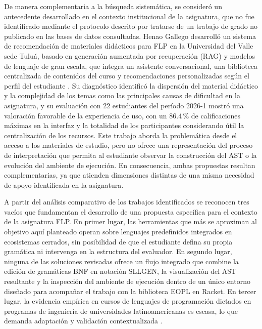 De manera complementaria a la búsqueda sistemática, se consideró un antecedente desarrollado en el contexto institucional de la asignatura, que no fue identificado mediante el protocolo descrito por tratarse de un trabajo de grado no publicado en las bases de datos consultadas. Henao Gallego desarrolló un sistema de recomendación de materiales didácticos para FLP en la Universidad del Valle sede Tuluá, basado en generación aumentada por recuperación (RAG) y modelos de lenguaje de gran escala, que integra un asistente conversacional, una biblioteca centralizada de contenidos del curso y recomendaciones personalizadas según el perfil del estudiante \cite{henao2026recomendacion}. Su diagnóstico identificó la dispersión del material didáctico y la complejidad de los temas como las principales causas de dificultad en la asignatura, y su evaluación con 22 estudiantes del período 2026-1 mostró una valoración favorable de la experiencia de uso, con un 86.4\,\% de calificaciones máximas en la interfaz y la totalidad de los participantes considerando útil la centralización de los recursos. Este trabajo aborda la problemática desde el acceso a los materiales de estudio, pero no ofrece una representación del proceso de interpretación que permita al estudiante observar la construcción del AST o la evolución del ambiente de ejecución. En consecuencia, ambas propuestas resultan complementarias, ya que atienden dimensiones distintas de una misma necesidad de apoyo identificada en la asignatura.

A partir del análisis comparativo de los trabajos identificados se reconocen tres vacíos que fundamentan el desarrollo de una propuesta específica para el contexto de la asignatura FLP. En primer lugar, las herramientas que más se aproximan al objetivo aquí planteado \cite{Cai2023VisualizingEnvironments, Abad2024BeyondSICP, Spigariol2023Aprendiendo} operan sobre lenguajes predefinidos integrados en ecosistemas cerrados, sin posibilidad de que el estudiante defina su propia gramática ni intervenga en la estructura del evaluador. En segundo lugar, ninguna de las soluciones revisadas ofrece un flujo integrado que combine la edición de gramáticas BNF en notación SLLGEN, la visualización del AST resultante y la inspección del ambiente de ejecución dentro de un único entorno diseñado para acompañar el trabajo con la biblioteca EOPL en Racket. En tercer lugar, la evidencia empírica en cursos de lenguajes de programación dictados en programas de ingeniería de universidades latinoamericanas es escasa, lo que demanda adaptación y validación contextualizada \cite{lu2022usability, jovanovic2021comvis}.

